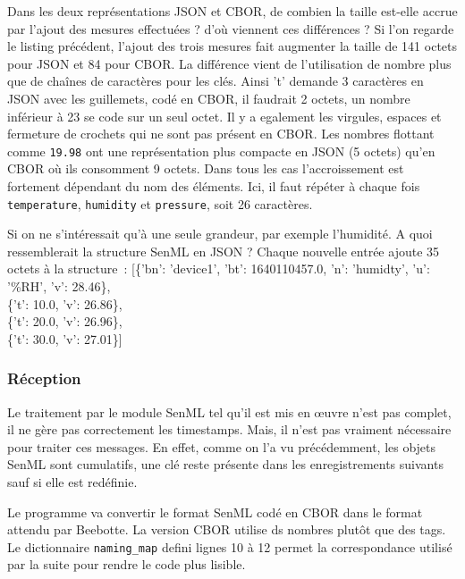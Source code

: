  {Dans les deux représentations JSON et CBOR, de combien la taille est-elle accrue par l'ajout des mesures effectuées ? d'où viennent ces différences ?}
 {
 Si l'on regarde le listing précédent, l'ajout des trois mesures fait augmenter la taille de 141 octets pour JSON et 84 pour CBOR. La différence vient de l'utilisation de nombre plus que de chaînes de caractères pour les clés. Ainsi 't' demande 3 caractères en JSON avec les guillemets, codé en CBOR, il faudrait 2 octets, un nombre inférieur à 23 se code sur un seul octet. Il y a egalement les virgules, espaces et fermeture de crochets qui ne sont pas présent en CBOR. Les nombres flottant comme \texttt{19.98} ont une représentation plus compacte en JSON (5 octets) qu'en CBOR où ils consomment 9 octets. Dans tous les cas l'accroissement est fortement dépendant du nom des éléments. Ici, il faut répéter à chaque fois \texttt{temperature}, \texttt{humidity} et \texttt{pressure}, soit 26 caractères.
 }
 
 {Si on ne s'intéressait qu'à une seule grandeur, par exemple l'humidité. A quoi ressemblerait la structure SenML en JSON ?}
 {
 Chaque nouvelle entrée ajoute 35 octets à la structure~: 
 [\{'bn': 'device1',  'bt': 1640110457.0, 'n': 'humidty', 'u': '\%RH', 'v': 28.46\},\\
 \{'t': 10.0, 'v': 26.86\},\\
 \{'t': 20.0, 'v': 26.96\},\\
 \{'t': 30.0, 'v': 27.01\}]\\
 }
 
 \subsubsection{Réception}
 
 Le traitement par le module SenML tel qu'il est mis en œuvre n'est pas complet, il ne gère pas correctement les timestamps. Mais, il n'est pas vraiment nécessaire pour traiter ces messages. En effet, comme on l'a vu précédemment, les objets SenML sont cumulatifs, une clé reste présente dans les enregistrements suivants sauf si elle est redéfinie. 
 
 
 
 Le programme  va convertir le format SenML codé en CBOR dans le format attendu par Beebotte. 
 La version CBOR utilise ds nombres plutôt que des tags.
 Le dictionnaire \texttt{naming\_map} defini lignes 10 à 12 permet la correspondance utilisé par la suite pour rendre le code plus lisible.
 
